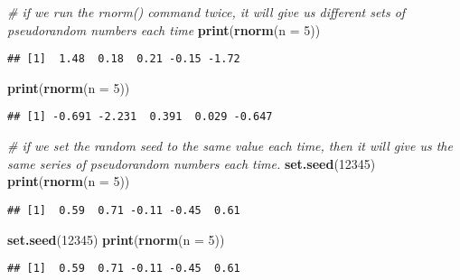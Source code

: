 \documentclass[]{book}
\newenvironment{Shaded}{\begin{snugshade}}{\end{snugshade}}
\newcommand{\KeywordTok}[1]{\textcolor[rgb]{0.13,0.29,0.53}{\textbf{#1}}}
\newcommand{\DataTypeTok}[1]{\textcolor[rgb]{0.13,0.29,0.53}{#1}}
\newcommand{\DecValTok}[1]{\textcolor[rgb]{0.00,0.00,0.81}{#1}}
\newcommand{\CommentTok}[1]{\textcolor[rgb]{0.56,0.35,0.01}{\textit{#1}}}
\newcommand{\NormalTok}[1]{#1}
\theoremstyle{definition}
\theoremstyle{definition}
\theoremstyle{definition}
\theoremstyle{remark}
\begin{document}
\begin{Shaded}
\begin{Highlighting}[]
\CommentTok{# if we run the rnorm() command twice, it will give us different sets of pseudorandom numbers each time}
\KeywordTok{print}\NormalTok{(}\KeywordTok{rnorm}\NormalTok{(}\DataTypeTok{n =} \DecValTok{5}\NormalTok{))}
\end{Highlighting}
\end{Shaded}

\begin{verbatim}
## [1]  1.48  0.18  0.21 -0.15 -1.72
\end{verbatim}

\begin{Shaded}
\begin{Highlighting}[]
\KeywordTok{print}\NormalTok{(}\KeywordTok{rnorm}\NormalTok{(}\DataTypeTok{n =} \DecValTok{5}\NormalTok{))}
\end{Highlighting}
\end{Shaded}

\begin{verbatim}
## [1] -0.691 -2.231  0.391  0.029 -0.647
\end{verbatim}

\begin{Shaded}
\begin{Highlighting}[]
\CommentTok{# if we set the random seed to the same value each time, then it will give us the same series of pseudorandom numbers each time.}
\KeywordTok{set.seed}\NormalTok{(}\DecValTok{12345}\NormalTok{)}
\KeywordTok{print}\NormalTok{(}\KeywordTok{rnorm}\NormalTok{(}\DataTypeTok{n =} \DecValTok{5}\NormalTok{))}
\end{Highlighting}
\end{Shaded}

\begin{verbatim}
## [1]  0.59  0.71 -0.11 -0.45  0.61
\end{verbatim}

\begin{Shaded}
\begin{Highlighting}[]
\KeywordTok{set.seed}\NormalTok{(}\DecValTok{12345}\NormalTok{)}
\KeywordTok{print}\NormalTok{(}\KeywordTok{rnorm}\NormalTok{(}\DataTypeTok{n =} \DecValTok{5}\NormalTok{))}
\end{Highlighting}
\end{Shaded}

\begin{verbatim}
## [1]  0.59  0.71 -0.11 -0.45  0.61
\end{verbatim}
\end{document}
